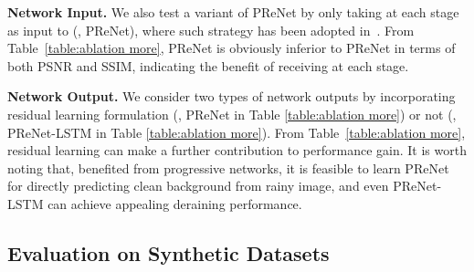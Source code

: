\documentclass[10pt,twocolumn,letterpaper]{article}
\begin{document}
\vspace{.05in}
\noindent \textbf{Network Input.}
We also test a variant of PReNet by only taking  at each stage as input to  (\ie, PReNet), where such strategy has been adopted in~\cite{yang2017deep,li2018recurrent}.
From Table~\ref{table:ablation more}, PReNet is obviously inferior to PReNet in terms of both PSNR and SSIM, indicating the benefit of receiving  at each stage.




\vspace{.05in}
\noindent \textbf{Network Output.}
We consider two types of network outputs by incorporating residual learning formulation (\ie, PReNet in Table \ref{table:ablation more}) or not (\ie, PReNet-LSTM  in Table \ref{table:ablation more}).
From Table~\ref{table:ablation more}, residual learning can make a further contribution to performance gain.
It is worth noting that, benefited from progressive networks, it is feasible to
learn PReNet for directly predicting clean background from rainy image, and even PReNet-LSTM can achieve appealing deraining performance.









\subsection{Evaluation on Synthetic Datasets}\label{sec:synthetic}
\end{document}
